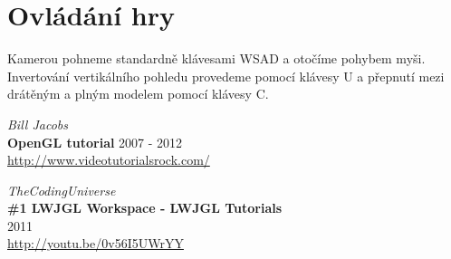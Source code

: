 \documentclass[11pt]{article}
\begin{document}
\section{Ovládání hry}
Kamerou pohneme standardně klávesami WSAD a otočíme pohybem myši. Invertování
vertikálního pohledu provedeme pomocí klávesy U a přepnutí mezi drátěným a
plným modelem pomocí klávesy C.


\begin{thebibliography}{3}
{\em Bill Jacobs} \\
{\bf OpenGL tutorial}
	2007 - 2012 \\
\url{http://www.videotutorialsrock.com/}

{\em TheCodingUniverse} \\
{\bf \#1 LWJGL Workspace - LWJGL Tutorials} \\
	2011 \\
\url{http://youtu.be/0v56I5UWrYY}


\end{thebibliography}
\end{document}
